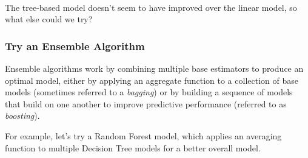 \documentclass[11pt]{article}
\begin{document}
    \begin{center}
    \end{center}
    { \hspace*{\fill} \\}
    
    The tree-based model doesn't seem to have improved over the linear
model, so what else could we try?

\hypertarget{try-an-ensemble-algorithm}{%
\subsubsection{Try an Ensemble
Algorithm}\label{try-an-ensemble-algorithm}}

Ensemble algorithms work by combining multiple base estimators to
produce an optimal model, either by applying an aggregate function to a
collection of base models (sometimes referred to a \emph{bagging}) or by
building a sequence of models that build on one another to improve
predictive performance (referred to as \emph{boosting}).

For example, let's try a Random Forest model, which applies an averaging
function to multiple Decision Tree models for a better overall model.
\end{document}

